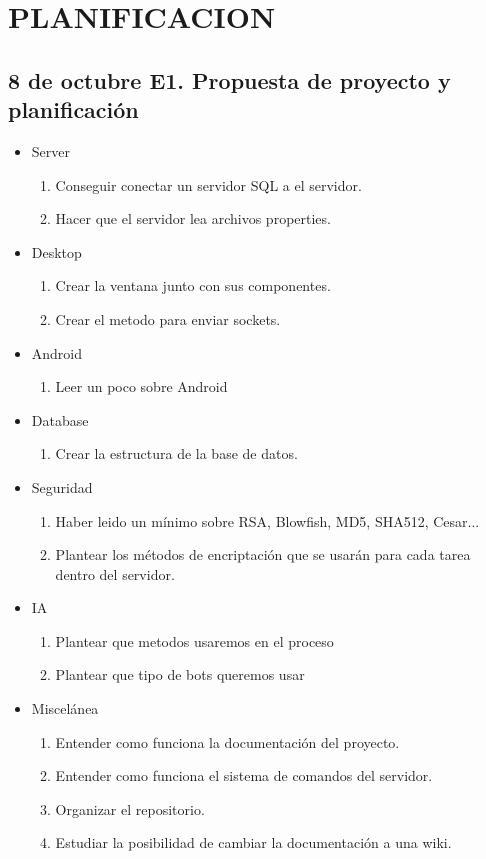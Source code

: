 \documentclass{article}
\theoremstyle{definition}
\begin{document}
\section{PLANIFICACION}

\subsection{8 de octubre	E1. Propuesta de proyecto y planificación }

\begin{itemize}
\item Server \begin{enumerate}
\item Conseguir conectar un servidor SQL a el servidor.
\item Hacer que el servidor lea archivos properties.
\end{enumerate}
\item Desktop \begin{enumerate}
\item Crear la ventana junto con sus componentes.
\item Crear el metodo para enviar sockets.
\end{enumerate}
\item Android \begin{enumerate}
\item Leer un poco sobre Android
\end{enumerate}
\item Database \begin{enumerate}
\item Crear la estructura de la base de datos.
\end{enumerate}
\item Seguridad \begin{enumerate}
\item Haber leido un mínimo sobre RSA, Blowfish, MD5, SHA512, Cesar... 
\item Plantear los métodos de encriptación que se usarán para cada tarea dentro del servidor.
\end{enumerate}
\item IA \begin{enumerate}
\item Plantear que metodos usaremos en el proceso
\item Plantear que tipo de bots queremos usar
\end{enumerate}
\item Miscelánea \begin{enumerate}
\item Entender como funciona la documentación del proyecto.
\item Entender como funciona el sistema de comandos del servidor.
\item Organizar el repositorio.
\item Estudiar la posibilidad de cambiar la documentación a una wiki.
\end{enumerate}

\end{itemize}
\end{document}
